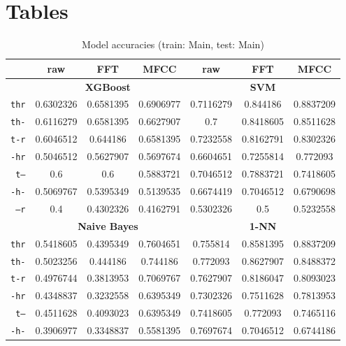 \documentclass[../main.tex]{subfiles}
\begin{document}
\chapter{Tables}
\label{cha:tables}

\begin{table}[ht]
	\centering
	\caption{Model accuracies (train: Main, test: Main)}
	\vspace{-0.15cm}
	\label{tab:model_acc_main_main}
	\begin{small}
	\begin{tabular}{|r|c|c|c|c|c|c|}
		\hline
		 & \textbf{raw} & \textbf{FFT} & \textbf{MFCC} & \textbf{raw} & \textbf{FFT} & \textbf{MFCC} \\
		\hline
		 & \multicolumn{3}{|c|}{\textbf{XGBoost}} & \multicolumn{3}{|c|}{\textbf{SVM}} \\
		\hline
		\texttt{thr} & 0.6302326 & 0.6581395 & 0.6906977 & 0.7116279 & 0.844186 & 0.8837209 \\
		\texttt{th-} & 0.6116279 & 0.6581395 & 0.6627907 & 0.7 & 0.8418605 & 0.8511628 \\
		\texttt{t-r} & 0.6046512 & 0.644186 & 0.6581395 & 0.7232558 & 0.8162791 & 0.8302326 \\
		\texttt{-hr} & 0.5046512 & 0.5627907 & 0.5697674 & 0.6604651 & 0.7255814 & 0.772093 \\
		\texttt{t--} & 0.6 & 0.6 & 0.5883721 & 0.7046512 & 0.7883721 & 0.7418605 \\
		\texttt{-h-} & 0.5069767 & 0.5395349 & 0.5139535 & 0.6674419 & 0.7046512 & 0.6790698 \\
		\texttt{--r} & 0.4 & 0.4302326 & 0.4162791 & 0.5302326 & 0.5 & 0.5232558 \\
		\hline
		 & \multicolumn{3}{|c|}{\textbf{Naive Bayes}} & \multicolumn{3}{|c|}{\textbf{1-NN}} \\
		\hline
		\texttt{thr} & 0.5418605 & 0.4395349 & 0.7604651 & 0.755814 & 0.8581395 & 0.8837209 \\
		\texttt{th-} & 0.5023256 & 0.444186 & 0.744186 & 0.772093 & 0.8627907 & 0.8488372 \\
		\texttt{t-r} & 0.4976744 & 0.3813953 & 0.7069767 & 0.7627907 & 0.8186047 & 0.8093023 \\
		\texttt{-hr} & 0.4348837 & 0.3232558 & 0.6395349 & 0.7302326 & 0.7511628 & 0.7813953 \\
		\texttt{t--} & 0.4511628 & 0.4093023 & 0.6395349 & 0.7418605 & 0.772093 & 0.7465116 \\
		\texttt{-h-} & 0.3906977 & 0.3348837 & 0.5581395 & 0.7697674 & 0.7046512 & 0.6744186 \\

\end{tabular}
\end{small}
\end{table}
\end{document}
